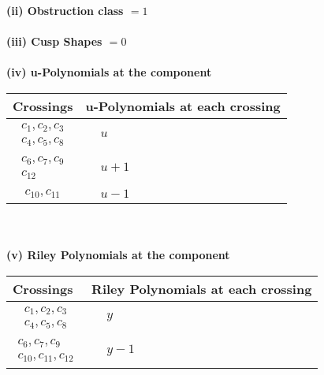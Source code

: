 \documentclass[1p]{elsarticle_modified}
\theoremstyle{definition}
\begin{document}
\flushleft \textbf{(ii) Obstruction class $= 1$}\\~\\
\flushleft \textbf{(iii) Cusp Shapes $= 0$}\\~\\
\newpage\renewcommand{\arraystretch}{1}
\flushleft \textbf{(iv) u-Polynomials at the component}\newline \\
\begin{tabular}{m{50pt}|m{274pt}}
Crossings & \hspace{64pt}u-Polynomials at each crossing \\
\hline $$\begin{aligned}c_{1},c_{2},c_{3}\\c_{4},c_{5},c_{8}\end{aligned}$$&$\begin{aligned}
&u
\end{aligned}$\\
\hline $$\begin{aligned}c_{6},c_{7},c_{9}\\c_{12}\end{aligned}$$&$\begin{aligned}
&u+1
\end{aligned}$\\
\hline $$\begin{aligned}c_{10},c_{11}\end{aligned}$$&$\begin{aligned}
&u-1
\end{aligned}$\\
\hline
\end{tabular}\\~\\
\newpage\renewcommand{\arraystretch}{1}
\flushleft \textbf{(v) Riley Polynomials at the component}\newline \\
\begin{tabular}{m{50pt}|m{274pt}}
Crossings & \hspace{64pt}Riley Polynomials at each crossing \\
\hline $$\begin{aligned}c_{1},c_{2},c_{3}\\c_{4},c_{5},c_{8}\end{aligned}$$&$\begin{aligned}
&y
\end{aligned}$\\
\hline $$\begin{aligned}c_{6},c_{7},c_{9}\\c_{10},c_{11},c_{12}\end{aligned}$$&$\begin{aligned}
&y-1
\end{aligned}$\\
\hline
\end{tabular}\\~\\
\end{document}
